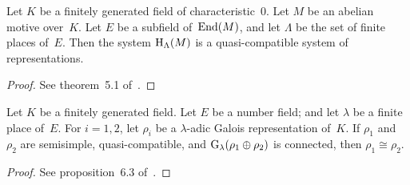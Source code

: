 \documentclass[10pt,twoside,leqno]{article}
\numberwithin{equation}{subsection}
\newcommand{\End}{\textnormal{End}}
\newcommand{\HH}{\textnormal{H}}
\newcommand{\HLambda}{\HH_{\Lambda}}
\newcommand{\GG}{\textnormal{G}}
\newcommand{\Glambda}{\GG_{\lambda}}
\begin{document}
\begin{theorem} %
 \label{abelian-motive-quasi-compatible-realisations}
 Let $K$ be a finitely generated field of characteristic~$0$.
 Let $M$ be an abelian motive over~$K$.
 Let $E$ be a subfield of~$\End(M)$,
 and let $\Lambda$ be the set of finite places of~$E$.
 Then the system $\HLambda(M)$ is a quasi-compatible system of representations.
 \begin{proof}
  See theorem~5.1 of~\cite{Co17}.
 \end{proof}
\end{theorem}

\begin{proposition} %
 \label{quasi-compatible-semisimple-isomorphic}
 Let $K$ be a finitely generated field.
 Let $E$ be a number field; and
 let $\lambda$ be a finite place of~$E$.
 For $i = 1,2$,
 let $\rho_i$ be a $\lambda$-adic Galois representation of~$K$.
 If $\rho_1$ and~$\rho_2$ are semisimple, quasi-compatible,
 and $\Glambda(\rho_1 \oplus \rho_2)$ is connected,
 then $\rho_1 \cong \rho_2$.
 \begin{proof}
  See proposition~6.3 of~\cite{Co17}.
 \end{proof}
\end{proposition}
\end{document}
